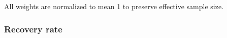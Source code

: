 All weights are normalized to mean 1 to preserve effective sample size.

\subsubsection{Recovery rate}

